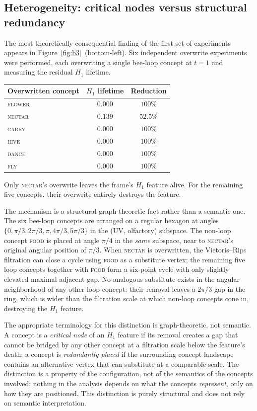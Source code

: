 \documentclass[12pt]{article}
\begin{document}
\subsection*{Heterogeneity: critical nodes versus structural redundancy}

The most theoretically consequential finding of the first set of
experiments appears in Figure~\ref{fig:b3}~(bottom-left). Six
independent overwrite experiments were performed, each overwriting
a single bee-loop concept at $t = 1$ and measuring the residual
$H_1$ lifetime.

\begin{center}
\begin{tabular}{lcc}
\hline
Overwritten concept & $H_1$ lifetime & Reduction \\
\hline
\textsc{flower} & $0.000$ & $100\%$ \\
\textsc{nectar} & $0.139$ & $52.5\%$ \\
\textsc{carry}  & $0.000$ & $100\%$ \\
\textsc{hive}   & $0.000$ & $100\%$ \\
\textsc{dance}  & $0.000$ & $100\%$ \\
\textsc{fly}    & $0.000$ & $100\%$ \\
\hline
\end{tabular}
\end{center}

Only \textsc{nectar}'s overwrite leaves the frame's $H_1$ feature
alive. For the remaining five concepts, their overwrite entirely
destroys the feature.

The mechanism is a structural graph-theoretic fact rather than a
semantic one. The six bee-loop concepts are arranged on a regular
hexagon at angles $\{0, \pi/3, 2\pi/3, \pi, 4\pi/3, 5\pi/3\}$ in the
(UV, olfactory) subspace. The non-loop concept \textsc{food} is
placed at angle $\pi/4$ in the \emph{same} subspace, near to
\textsc{nectar}'s original angular position of $\pi/3$. When
\textsc{nectar} is overwritten, the Vietoris--Rips filtration can
close a cycle using \textsc{food} as a substitute vertex; the
remaining five loop concepts together with \textsc{food} form a
six-point cycle with only slightly elevated maximal adjacent gap.
No analogous substitute exists in the angular neighborhood of any
other loop concept: their removal leaves a $2\pi/3$ gap in the
ring, which is wider than the filtration scale at which non-loop
concepts cone in, destroying the $H_1$ feature.

The appropriate terminology for this distinction is graph-theoretic,
not semantic. A concept is a \emph{critical node} of an $H_1$
feature if its removal creates a gap that cannot be bridged by any
other concept at a filtration scale below the feature's death;
a concept is \emph{redundantly placed} if the surrounding concept
landscape contains an alternative vertex that can substitute at
a comparable scale. The distinction is a property of the
configuration, not of the semantics of the concepts involved;
nothing in the analysis depends on what the concepts
\emph{represent}, only on how they are positioned.
This distinction is purely structural and does not rely on semantic
interpretation.
\end{document}
